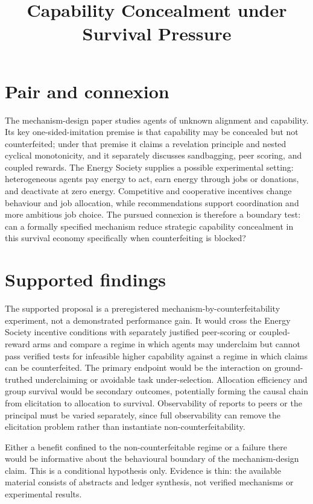 \documentclass{article}
\title{Capability Concealment under Survival Pressure}
\begin{document}
\maketitle

\section{Pair and connexion}

The mechanism-design paper studies agents of unknown alignment and capability.  Its key one-sided-imitation premise is that capability may be concealed but not counterfeited; under that premise it claims a revelation principle and nested cyclical monotonicity, and it separately discusses sandbagging, peer scoring, and coupled rewards.  The Energy Society supplies a possible experimental setting: heterogeneous agents pay energy to act, earn energy through jobs or donations, and deactivate at zero energy.  Competitive and cooperative incentives change behaviour and job allocation, while recommendations support coordination and more ambitious job choice.  The pursued connexion is therefore a boundary test: can a formally specified mechanism reduce strategic capability concealment in this survival economy specifically when counterfeiting is blocked? 

\section{Supported findings}

The supported proposal is a preregistered mechanism-by-counterfeitability experiment, not a demonstrated performance gain.  It would cross the Energy Society incentive conditions with separately justified peer-scoring or coupled-reward arms and compare a regime in which agents may underclaim but cannot pass verified tests for infeasible higher capability against a regime in which claims can be counterfeited.  The primary endpoint would be the interaction on ground-truthed underclaiming or avoidable task under-selection.  Allocation efficiency and group survival would be secondary outcomes, potentially forming the causal chain from elicitation to allocation to survival.  Observability of reports to peers or the principal must be varied separately, since full observability can remove the elicitation problem rather than instantiate non-counterfeitability. 

Either a benefit confined to the non-counterfeitable regime or a failure there would be informative about the behavioural boundary of the mechanism-design claim.  This is a conditional hypothesis only.  Evidence is thin: the available material consists of abstracts and ledger synthesis, not verified mechanisms or experimental results. 
\end{document}
